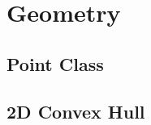 \documentclass[a4paper,10pt,twocolumn,oneside]{article}
\begin{document}
%

%


\section{Geometry}
%

%
%

%

%

\subsection{Point Class}


\subsection{2D Convex Hull}

\end{document}
